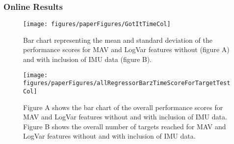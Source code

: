 	\subsubsection*{Online Results}
\begin{figure}[H]
	\centering
	\texttt{[image: figures/paperFigures/GotItTimeCol]}  %
	\caption{Bar chart representing the mean and standard deviation of the performance scores for MAV and LogVar features without (figure A) and with inclusion of IMU data (figure B).}
	\label{fig:GotItTimeCol}
\end{figure}
	
\begin{figure}[H]
	\centering
	\texttt{[image: figures/paperFigures/allRegressorBarzTimeScoreForTargetTestCol]}  %
	\caption{Figure A shows the bar chart of the overall performance scores for MAV and LogVar features without and with inclusion of IMU data. Figure B shows the overall number of targets reached for MAV and LogVar features without and with inclusion of IMU data.}
	\label{fig:TargetScoresTargetsCol}  %
\end{figure}
